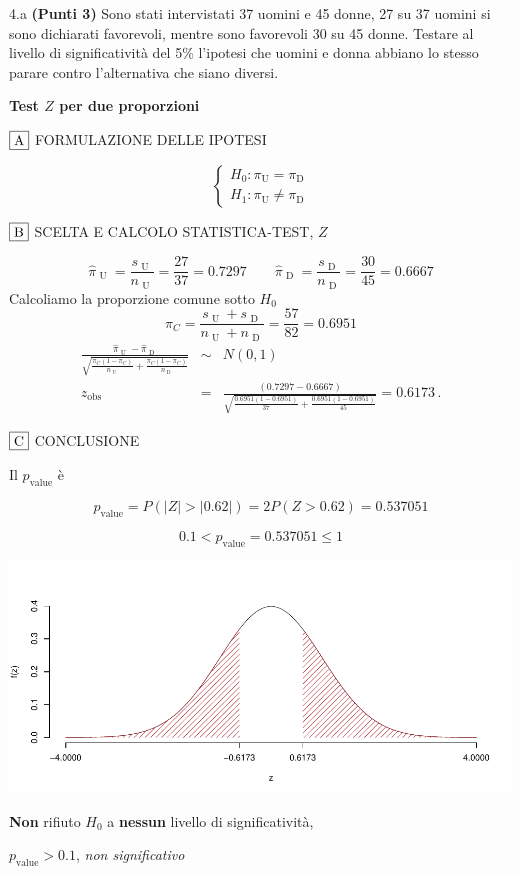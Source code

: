 \documentclass[
  11pt,
]{book}
\theoremstyle{mytheoremstyle}
\theoremstyle{mydefstyle}
\newenvironment{sol}
  {
  \begin{tcolorbox}[enhanced,breakable,arc=0.1mm,boxrule=1pt,colback=white,colframe=iblue,
  title=\bf \fontfamily{lmss}\selectfont \hspace{.5 cm} Soluzione,drop fuzzy shadow]

}{
\end{tcolorbox}
  }
\begin{document}
4.a \textbf{(Punti 3)} Sono stati intervistati 37 uomini e 45 donne,
27 su 37 uomini si sono dichiarati favorevoli, mentre sono favorevoli
30 su 45 donne. Testare al livello di significatività del 5\% l'ipotesi
che uomini e donna abbiano lo stesso parare contro l'alternativa che siano
diversi.

\begin{sol}
\textbf{Test \(Z\) per due proporzioni}

\(\fbox{A}\) FORMULAZIONE DELLE IPOTESI

\[\begin{cases}
   H_0: \pi_\text{U} = \pi_\text{D} \\
   H_1: \pi_\text{U} \neq \pi_\text{D} 
   \end{cases}\]

\(\fbox{B}\) SCELTA E CALCOLO STATISTICA-TEST, \(Z\)

\[\hat\pi_\text{ U }=\frac{s_\text{ U }}{n_\text{ U }}=\frac{ 27 }{ 37 }= 0.7297 \qquad
   \hat\pi_\text{ D }=\frac{s_\text{ D }}{n_\text{ D }}=\frac{ 30 }{ 45 }= 0.6667 \]Calcoliamo la proporzione comune sotto \(H_0\)
\[
     \pi_C=\frac{s_\text{ U }+s_\text{ D }}{n_\text{ U }+n_\text{ D }}=
     \frac{ 57 }{ 82 }= 0.6951 
   \]\begin{eqnarray*}
   \frac{\hat\pi_\text{ U } - \hat\pi_\text{ D }}
   {\sqrt{\frac {\pi_C(1-\pi_C)}{n_\text{ U }}+\frac {\pi_C(1-\pi_C)}{n_\text{ D }}}}&\sim&N(0,1)\\
   z_{\text{obs}}
   &=& \frac{ ( 0.7297 -  0.6667 )} {\sqrt{\frac{ 0.6951 (1- 0.6951 )}{ 37 }+\frac{ 0.6951 (1- 0.6951 )}{ 45 }}}
   =   0.6173 \, .
   \end{eqnarray*}

\(\fbox{C}\) CONCLUSIONE

Il \(p_{\text{value}}\) è

\[ p_{\text{value}} = P(|Z|>|0.62|)=2P(Z>0.62)=0.537051 \]

\[
 0.1 < p_\text{value}= 0.537051 \leq 1 
\]

\begin{center}\includegraphics{Appunti_di_Statistica_2025_files/figure-latex/unnamed-chunk-21-1} \end{center}

\textbf{Non} rifiuto \(H_0\) a \textbf{nessun}
livello di significatività,

\(p_\text{value}>0.1\),
\emph{non significativo}

\end{sol}
\end{document}
